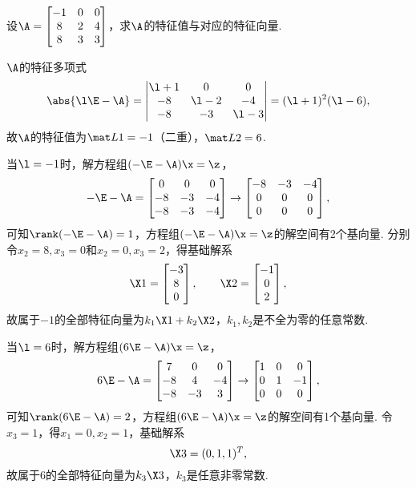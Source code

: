 \begin{example}
设\(\A = \begin{bmatrix}
-1 & 0 & 0 \\
8 & 2 & 4 \\
8 & 3 & 3
\end{bmatrix}\)，求\(\A\)的特征值与对应的特征向量.
\begin{solution}
\(\A\)的特征多项式\[
\abs{\l\E-\A}
= \begin{vmatrix}
\l+1 & 0 & 0 \\
-8 & \l-2 & -4 \\
-8 & -3 & \l-3
\end{vmatrix}
= (\l+1)^2 (\l-6),
\]故\(\A\)的特征值为\(\L{1}=-1\)（二重），\(\L{2}=6\).

当\(\l=-1\)时，解方程组\((-\E-\A)\x = \z\)，\[
-\E-\A = \begin{bmatrix}
0 & 0 & 0 \\
-8 & -3 & -4 \\
-8 & -3 & -4
\end{bmatrix} \to \begin{bmatrix}
-8 & -3 & -4 \\
0 & 0 & 0 \\
0 & 0 & 0
\end{bmatrix},
\]可知\(\rank(-\E-\A) = 1\)，方程组\((-\E-\A)\x = \z\)的解空间有2个基向量.
分别令\(x_2 = 8, x_3 = 0\)和\(x_2 = 0, x_3 = 2\)，得基础解系\[
\X1 = \begin{bmatrix} -3 \\ 8 \\ 0 \end{bmatrix},
\qquad
\X2 = \begin{bmatrix} -1 \\ 0 \\ 2 \end{bmatrix},
\]故属于\(-1\)的全部特征向量为\(k_1 \X1 + k_2 \X2\)，\(k_1,k_2\)是不全为零的任意常数.

当\(\l=6\)时，解方程组\((6\E-\A)\x = \z\)，\[
6\E-\A = \begin{bmatrix}
7 & 0 & 0 \\
-8 & 4 & -4 \\
-8 & -3 & 3
\end{bmatrix} \to \begin{bmatrix}
1 & 0 & 0 \\
0 & 1 & -1 \\
0 & 0 & 0
\end{bmatrix},
\]可知\(\rank(6\E-\A) = 2\)，方程组\((6\E-\A)\x = \z\)的解空间有1个基向量.
令\(x_3 = 1\)，得\(x_1 = 0, x_2 = 1\)，基础解系\[
\X3 = (0,1,1)^T,
\]故属于\(6\)的全部特征向量为\(k_3 \X3\)，\(k_3\)是任意非零常数.
\end{solution}
\end{example}

